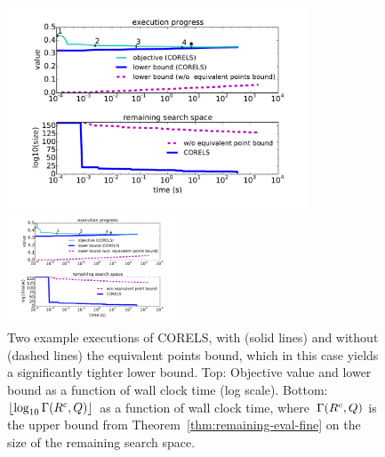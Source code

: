 \begin{figure}[t!]
\begin{center}
\begin{arxiv}
\includegraphics[width=0.8\textwidth]{figs/compas_execution-remaining-space.pdf}
\end{arxiv}
\begin{kdd}
\includegraphics[trim={20mm, 20mm, 10mm, 5mm}, width=0.45\textwidth]{figs/compas_execution-remaining-space.pdf}
\end{kdd}
\end{center}
\caption{Two example executions of CORELS, with (solid lines)
and without (dashed lines) the equivalent points bound,
which in this case yields a significantly tighter lower bound.
%
Top: Objective value and lower bound as a function of wall clock time (log scale).
%
%
Bottom:
$\lfloor \log_{10} \Gamma({R^c}, Q) \rfloor$
as a function of wall clock time,
where~$\Gamma({R^c}, Q)$ is the upper bound
from Theorem~\ref{thm:remaining-eval-fine}
on the size of the remaining search space.}
\label{fig:objective}
\end{figure}

